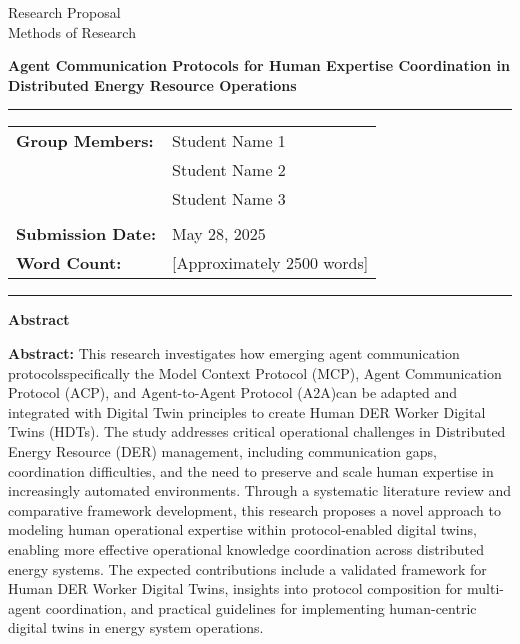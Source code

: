 \documentclass[12pt,a4paper]{article}
\newcommand{\studentone}{Student Name 1}
\newcommand{\studenttwo}{Student Name 2}
\newcommand{\studentthree}{Student Name 3}
\newcommand{\projecttitle}{Agent Communication Protocols for Human Expertise Coordination in Distributed Energy Resource Operations}
\newcommand{\submissiondate}{May 28, 2025}
\newcommand{\emdash}{\textemdash}
\begin{document}
\begin{titlepage}
\begin{center}
{\Huge{Research Proposal}} \\
\vspace{5mm}
{\Large{Methods of Research}} \\

\vspace{10mm}

{\huge{\textbf{\projecttitle}}} \\

\vspace{15mm}

\hrule
\vspace{3mm}
\begin{tabular}{ll}
\textbf{Group Members:} & {\studentone} \\
& {\studenttwo} \\
& {\studentthree} \\
\\
\textbf{Submission Date:} & {\submissiondate} \\
\textbf{Word Count:} & [Approximately 2500 words] \\
\end{tabular}
\vspace{3mm}
\hrule

\vspace{15mm}

\textbf{Abstract} \\
\vspace{2mm}
\begin{minipage}{0.8\textwidth}
\textbf{Abstract:} This research investigates how emerging agent communication protocols\emdash{}specifically the Model Context Protocol (MCP), Agent Communication Protocol (ACP), and Agent-to-Agent Protocol (A2A)\emdash{}can be adapted and integrated with Digital Twin principles to create Human DER Worker Digital Twins (HDTs). The study addresses critical operational challenges in Distributed Energy Resource (DER) management, including communication gaps, coordination difficulties, and the need to preserve and scale human expertise in increasingly automated environments. Through a systematic literature review and comparative framework development, this research proposes a novel approach to modeling human operational expertise within protocol-enabled digital twins, enabling more effective operational knowledge coordination across distributed energy systems. The expected contributions include a validated framework for Human DER Worker Digital Twins, insights into protocol composition for multi-agent coordination, and practical guidelines for implementing human-centric digital twins in energy system operations.
\end{minipage}

\end{center}
\end{titlepage}
\end{document}
